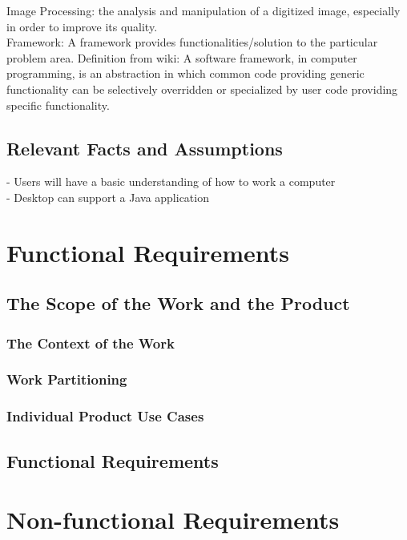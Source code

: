 \documentclass[12pt, titlepage]{article}
\begin{document}
Image Processing: the analysis and manipulation of a digitized image, especially in order to improve its quality.\\

Framework: A framework provides functionalities/solution to the particular problem area. Definition from wiki: A software framework, in computer programming, is an abstraction in which common code providing generic functionality can be selectively overridden or specialized by user code providing specific functionality.


\subsection{Relevant Facts and Assumptions}


- Users will have a basic understanding of how to work a computer\\
- Desktop can support a Java application


\section{Functional Requirements}

\subsection{The Scope of the Work and the Product}

\subsubsection{The Context of the Work}

\subsubsection{Work Partitioning}

\subsubsection{Individual Product Use Cases}

\subsection{Functional Requirements}

\section{Non-functional Requirements}
\end{document}
